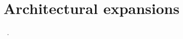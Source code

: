 \chapter{Architectural expansions}\label{ch:architectural}

~\cite{Chatzilygeroudis2016, Nazeer2023, Gillespie2018}.